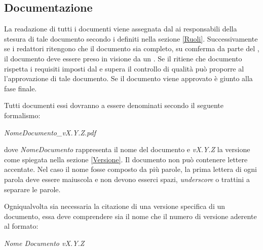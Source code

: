 \documentclass[12pt,a4paper]{article}
\begin{document}
\subsection{Documentazione}\label{Documentazione} %
La readazione di tutti i documenti viene assegnata dal \PM{} ai responsabili della stesura di tale documento secondo i  definiti nella sezione \ref{Ruoli}. Successivamente se i redattori ritengono che il documento sia completo, su comferma da parte del \PM, il documento deve essere preso in visione da un \VR. Se il \VR ritiene che documento rispetta i requisiti imposti dal \PR{} e supera il controllo di qualità può proporre al \PM{} l'approvazione di tale documento. Se il documento viene approvato è giunto alla fase finale.

Tutti documenti essi dovranno a essere denominati secondo il seguente formalismo:
\begin{center}
\emph{NomeDocumento\_vX.Y.Z.pdf}
\end{center}
dove \emph{NomeDocumento} rappresenta il nome del documento e \emph{vX.Y.Z} la versione come spiegata nella sezione \ref{Versione}. Il documento non può contenere lettere accentate. Nel caso il nome fosse composto da più parole, la prima lettera di ogni parola deve essere maiuscola e non devono esserci spazi, \emph{underscore} o trattini a separare le parole.

Ogniqualvolta sia necessaria la citazione di una versione specifica di un documento, essa deve comprendere sia il nome che il numero di versione aderente al formato:
\begin{center}
\emph{Nome Documento vX.Y.Z}
\end{center}
\end{document}
